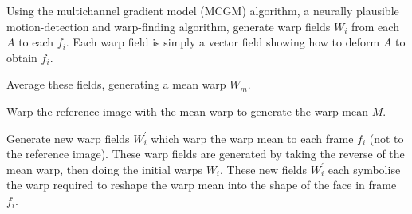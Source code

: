 \begin{enoomerate}
\item Using the multichannel gradient model (MCGM) algorithm\cite{mcowan1995algorithms}, a neurally plausible motion-detection and warp-finding algorithm, generate warp fields $W_i$ from each $A$ to each $f_i$. Each warp field is simply a vector field showing how to deform $A$ to obtain $f_i$.

\begin{center}
\end{center}

\item Average these fields, generating a mean warp $W_m$.
\item Warp the reference image with the mean warp to generate the warp mean $M$.

\begin{center}
\end{center}

\item Generate new warp fields $W_i^\prime$ which warp the warp mean to each frame $f_i$ (not to the reference image). These warp fields are generated by taking the reverse of the mean warp, then doing the initial warps $W_i$.
These new fields $W_i^\prime$ each symbolise the warp required to reshape the warp mean into the shape of the face in frame $f_i$.

\begin{center}
\end{center}


\end{enoomerate}

